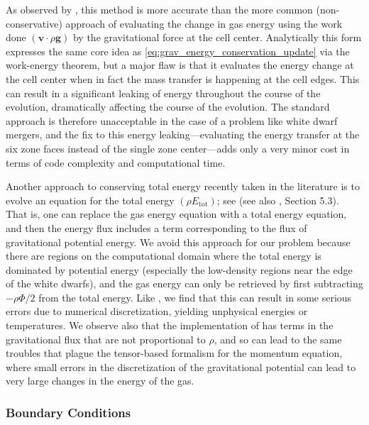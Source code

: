 \documentclass[12pt]{article}
\begin{document}
As observed by \cite{arepo}, this method is more accurate than the more common (non-conservative) approach
of evaluating the change in gas energy using the work done $(\mathbf{v} \cdot \rho \mathbf{g})$
by the gravitational force at the cell center. Analytically this form expresses the same core idea as
\autoref{eq:grav_energy_conservation_update} via the work-energy theorem, but a major flaw is that
it evaluates the energy change at the cell center when in fact the mass transfer is happening at
the cell edges. This can result in a significant leaking of energy throughout the course of the
evolution, dramatically affecting the course of the evolution. The standard approach is therefore
unacceptable in the case of a problem like white dwarf mergers, and the fix to this energy
leaking---evaluating the energy transfer at the six zone faces instead of the single zone
center---adds only a very minor cost in terms of code complexity and computational time.

Another approach to conserving total energy recently taken in the literature is to evolve an 
equation for the total energy $(\rho E_{\text{tot}})$; see \cite{jiang:2013} (see also 
\cite{arepo}, Section 5.3). That is, one can replace the gas energy equation with a total energy equation, 
and then the energy flux includes a term corresponding to the flux of gravitational potential energy. We 
avoid this approach for our problem because there are regions on the computational domain where the total 
energy is dominated by potential energy (especially the low-density regions near the edge of the white dwarfs),
and the gas energy can only be retrieved by first subtracting $-\rho \Phi/2$ from the total energy. Like 
\cite{arepo}, we find that this can result in some serious errors due to numerical discretization, yielding 
unphysical energies or temperatures. We observe also that the implementation of \cite{jiang:2013} 
has terms in the gravitational flux that are not proportional to $\rho$, and so can lead to the 
same troubles that plague the tensor-based formalism for the momentum equation, where small errors 
in the discretization of the gravitational potential can lead to very large changes in the energy of the gas.

\subsubsection{Boundary Conditions}
\label{sec:gravity_boundary_conditions}
\end{document}
